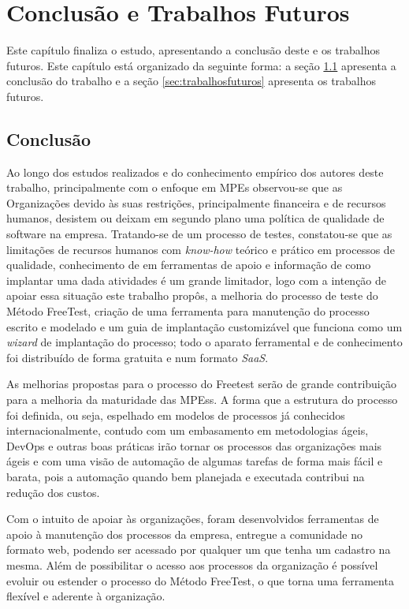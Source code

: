 \chapter{Conclusão e Trabalhos Futuros}
\label{sec:conclusaoetrabalhosfuturos}

Este capítulo finaliza o estudo, apresentando a conclusão deste e os trabalhos futuros. Este capítulo está organizado da seguinte forma: a seção \ref{sec:finalconclusao} apresenta a conclusão do trabalho e a seção \ref{sec:trabalhosfuturos} apresenta os trabalhos futuros. 

\section{Conclusão}
\label{sec:finalconclusao}

Ao longo dos estudos realizados e do conhecimento empírico dos autores deste trabalho, principalmente com o enfoque em MPEs observou-se que as Organizações devido às suas restrições, principalmente financeira e de recursos humanos, desistem ou deixam em segundo plano uma política de qualidade de software na empresa. Tratando-se de um processo de testes, constatou-se que as limitações de recursos humanos com \textit{know-how} teórico e prático em processos de qualidade, conhecimento de em ferramentas de apoio e informação de como implantar uma dada atividades é um grande limitador, logo com a intenção de apoiar essa situação este trabalho propôs, a melhoria do processo de teste do Método FreeTest, criação de uma ferramenta para manutenção do processo escrito e modelado e um guia de implantação customizável que funciona como um \textit{wizard} de implantação do processo; todo o aparato ferramental e de conhecimento foi distribuído de forma gratuita e num formato \textit{SaaS}.

As melhorias propostas para o processo do Freetest serão de grande contribuição para a melhoria da maturidade das MPEss. A forma que a estrutura do processo foi definida, ou seja, espelhado em modelos de processos já conhecidos internacionalmente, contudo com um embasamento em metodologias ágeis, DevOps e outras boas práticas irão tornar os processos das organizações mais ágeis e com uma visão de automação de algumas tarefas de forma mais fácil e barata, pois a automação quando bem planejada e executada contribui na redução dos custos. 

Com o intuito de apoiar às organizações, foram desenvolvidos ferramentas de apoio à manutenção dos processos da empresa, entregue a comunidade no formato web, podendo ser acessado por qualquer um que tenha um cadastro na mesma. Além de possibilitar o acesso aos processos da organização é possível evoluir ou estender o processo do Método FreeTest, o que torna uma ferramenta flexível e aderente à organização. 

